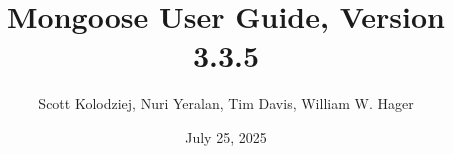 \title{Mongoose User Guide, Version 3.3.5}
\author{Scott Kolodziej, Nuri Yeralan, Tim Davis, William W. Hager}
\date{July 25, 2025}
